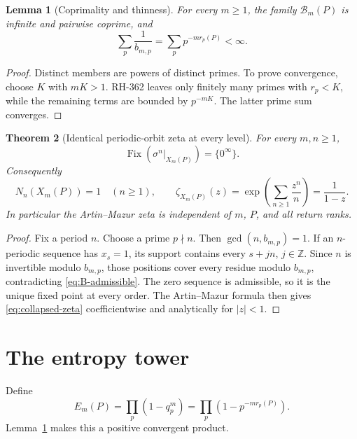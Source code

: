 \documentclass[11pt]{article}
\numberwithin{equation}{section}
\newtheorem{theorem}{Theorem}[section]
\newtheorem{lemma}[theorem]{Lemma}
\theoremstyle{remark}
\newcommand{\Fix}{\operatorname{Fix}}
\newcommand{\Z}{\mathbb Z}
\newcommand{\cB}{\mathcal B}
\begin{document}
\begin{lemma}[Coprimality and thinness]
\label{lem:thin}
For every $m\ge1$, the family $\cB_m(P)$ is infinite and pairwise
coprime, and
\begin{equation}
 \sum_p\frac1{b_{m,p}}
 =\sum_p p^{-m r_p(P)}<\infty.
 \label{eq:thin}
\end{equation}
\end{lemma}

\begin{proof}
Distinct members are powers of distinct primes.  To prove convergence, choose
$K$ with $mK>1$.  RH-362 leaves only finitely many primes with
$r_p<K$, while the remaining terms are bounded by $p^{-mK}$.  The latter
prime sum converges.
\end{proof}

\begin{theorem}[Identical periodic-orbit zeta at every level]
\label{thm:collapse}
For every $m,n\ge1$,
\[
 \Fix(\sigma^n|_{X_m(P)})=\{0^\infty\}.
\]
Consequently
\begin{equation}
 N_n(X_m(P))=1
 \quad(n\ge1),
 \qquad
 \zeta_{X_m(P)}(z)
 =\exp\!\left(\sum_{n\ge1}\frac{z^n}{n}\right)
 =\frac1{1-z}.
 \label{eq:collapsed-zeta}
\end{equation}
In particular the Artin--Mazur zeta is independent of $m$, $P$, and all
return ranks.
\end{theorem}

\begin{proof}
Fix a period $n$.  Choose a prime $p\nmid n$.  Then
$\gcd(n,b_{m,p})=1$.  If an $n$-periodic sequence has $x_s=1$, its
support contains every $s+jn$, $j\in\Z$.  Since $n$ is invertible
modulo $b_{m,p}$, those positions cover every residue modulo $b_{m,p}$,
contradicting \eqref{eq:B-admissible}.  The zero sequence is admissible, so
it is the unique fixed point at every order.  The Artin--Mazur formula then
gives \eqref{eq:collapsed-zeta} coefficientwise and analytically for
$|z|<1$.
\end{proof}

\section{The entropy tower}

Define
\begin{equation}
 E_m(P)=\prod_p(1-q_p^m)
 =\prod_p(1-p^{-m r_p(P)}).
 \label{eq:entropy-density}
\end{equation}
Lemma~\ref{lem:thin} makes this a positive convergent product.
\end{document}
